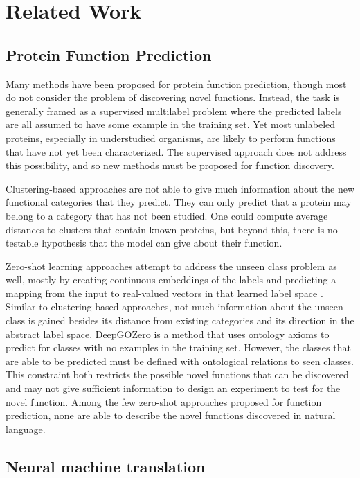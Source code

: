 \documentclass{specification}
\begin{document}
\section{Related Work}
\subsection{Protein Function Prediction}
Many methods have been proposed for protein function prediction, though most do not consider the problem of discovering novel functions.
Instead, the task is generally framed as a supervised multilabel problem where the predicted labels are all assumed to have some example in the training set.
Yet most unlabeled proteins, especially in understudied organisms, are likely to perform functions that have not yet been characterized.
The supervised approach does not address this possibility, and so new methods must be proposed for function discovery.

Clustering-based approaches are not able to give much information about the new functional categories that they predict.
They can only predict that a protein may belong to a category that has not been studied.
One could compute average distances to clusters that contain known proteins, but beyond this, there is no testable hypothesis that the model can give about their function.

Zero-shot learning approaches attempt to address the unseen class problem as well, mostly by creating continuous embeddings of the labels and predicting a mapping from the input to real-valued vectors in that learned label space \cite{CLIP}.
Similar to clustering-based approaches, not much information about the unseen class is gained besides its distance from existing categories and its direction in the abstract label space.
DeepGOZero \cite{DeepGOZero} is a method that uses ontology axioms to predict for classes with no examples in the training set.
However, the classes that are able to be predicted must be defined with ontological relations to seen classes.
This constraint both restricts the possible novel functions that can be discovered and may not give sufficient information to design an experiment to test for the novel function.
Among the few zero-shot approaches proposed for function prediction, none are able to describe the novel functions discovered in natural language.

\subsection{Neural machine translation}
\end{document}
